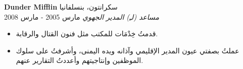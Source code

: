 \foreignlanguage{english}{\textbf{Dunder Mifflin}} \hfill سكرانتون، بنسلفانيا\\
\textit{مساعد (لـِ) المدير الجهوي} \hfill مارس 2005 - مارس 2008\\
\vspace*{-4pt}
\begin{itemize} \itemsep 1pt
	\item قدمتُ خِدْمَات للمكتب مثل فنون القتال والرقابة.
	\item عملتُ بصفتي عيون المدير الإقليمي وآذانه ويده اليمنى، وأشرفتُ على سلوك الموظفين وإنتاجيتهم وأعددتُ التقارير عنهم.
\end{itemize}
